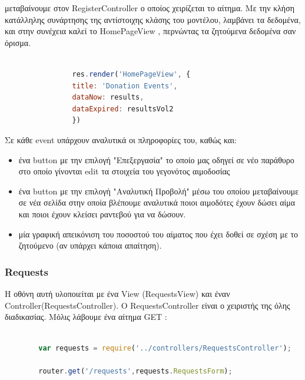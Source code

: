 μεταβαίνουμε στον RegisterController ο οποίος χειρίζεται το αίτημα. Με την κλήση κατάλληλης συνάρτησης της αντίστοιχης κλάσης του μοντέλου, λαμβάνει τα δεδομένα,  και στην συνέχεια καλεί το HomePageView , περνώντας τα ζητούμενα δεδομένα σαν όρισμα.



		\begin{lstlisting}[language=Javascript]			
		
	            res.render('HomePageView', { 
                title: 'Donation Events',
                dataNow: results,
                dataExpired: resultsVol2
                })

		\end{lstlisting}
		
		Σε κάθε event υπάρχουν αναλυτικά οι πληροφορίες του, καθώς και:
		
		\begin{itemize}
		\item ένα button με την επιλογή "Επεξεργασία" το οποίο μας οδηγεί σε νέο παράθυρο στο οποίο γίνονται edit τα στοιχεία του γεγονότος αιμοδοσίας
		
		\item ένα button με την επιλογή "Αναλυτική Προβολή" μέσω του οποίου μεταβαίνουμε σε νέα σελίδα στην οποία βλέπουμε αναλυτικά ποιοι αιμοδότες έχουν δώσει αίμα και ποιοι έχουν κλείσει ραντεβού για να δώσουν.
		
		\item μία γραφική απεικόνιση του ποσοστού του αίματος που έχει δοθεί σε σχέση με το ζητούμενο (αν υπάρχει κάποια απαίτηση).
		
		\end{itemize}
		

		
				\subsubsection{Requests}
		
	Η οθόνη αυτή υλοποιείται με ένα View (RequestsView) και έναν Controller(RequestsController). O RequestsController είναι ο χειριστής της όλης διαδικασίας. Μόλις λάβουμε ένα αίτημα GET :
		
		\begin{lstlisting}[language=Javascript]			
		
		var requests = require('../controllers/RequestsController');
		
		router.get('/requests',requests.RequestsForm);  


		\end{lstlisting}
		
